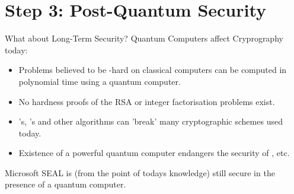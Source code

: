 \section{Step 3: Post-Quantum Security}
\begin{frame}{What about Long-Term Security?}
  Quantum Computers affect Cryprography today:
  \begin{itemize}
    \item Problems believed to be -hard on classical computers can be computed in polynomial time using a quantum computer.
    \item No hardness proofs of the RSA or integer factorisation problems exist.
    \item {}'s, 's and other algorithms can 'break' many cryptographic schemes used today.
    \item Existence of a powerful quantum computer endangers the security of , etc.
  \end{itemize}
  Microsoft SEAL is (from the point of todays knowledge) still secure in the presence of a quantum computer.
\end{frame}
